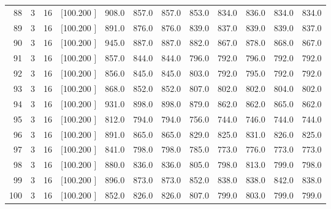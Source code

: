 \documentclass[12pt,a4paper]{article}
\begin{document}
\begin{center}
{\begin{tabular}{r r r r r r r r r r r r}
  88&  3& 16&[100.200   ]&   908.0&   857.0&   857.0&   853.0&   834.0&   836.0&   834.0&   834.0\\[-0.02in]
  89&  3& 16&[100.200   ]&   891.0&   876.0&   876.0&   839.0&   837.0&   839.0&   839.0&   837.0\\[-0.02in]
  90&  3& 16&[100.200   ]&   945.0&   887.0&   887.0&   882.0&   867.0&   878.0&   868.0&   867.0\\[-0.02in]
  91&  3& 16&[100.200   ]&   857.0&   844.0&   844.0&   796.0&   792.0&   796.0&   792.0&   792.0\\[-0.02in]
  92&  3& 16&[100.200   ]&   856.0&   845.0&   845.0&   803.0&   792.0&   795.0&   792.0&   792.0\\[-0.02in]
  93&  3& 16&[100.200   ]&   868.0&   852.0&   852.0&   807.0&   802.0&   802.0&   804.0&   802.0\\[-0.02in]
  94&  3& 16&[100.200   ]&   931.0&   898.0&   898.0&   879.0&   862.0&   862.0&   865.0&   862.0\\[-0.02in]
  95&  3& 16&[100.200   ]&   812.0&   794.0&   794.0&   756.0&   744.0&   746.0&   744.0&   744.0\\[-0.02in]
  96&  3& 16&[100.200   ]&   891.0&   865.0&   865.0&   829.0&   825.0&   831.0&   826.0&   825.0\\[-0.02in]
  97&  3& 16&[100.200   ]&   841.0&   798.0&   798.0&   785.0&   773.0&   776.0&   773.0&   773.0\\[-0.02in]
  98&  3& 16&[100.200   ]&   880.0&   836.0&   836.0&   805.0&   798.0&   813.0&   799.0&   798.0\\[-0.02in]
  99&  3& 16&[100.200   ]&   896.0&   873.0&   873.0&   852.0&   838.0&   838.0&   842.0&   838.0\\[-0.02in]
 100&  3& 16&[100.200   ]&   852.0&   826.0&   826.0&   807.0&   799.0&   803.0&   799.0&   799.0\\[-0.02in]

\hline
\end{tabular}}
\end{center}
\end{document}
